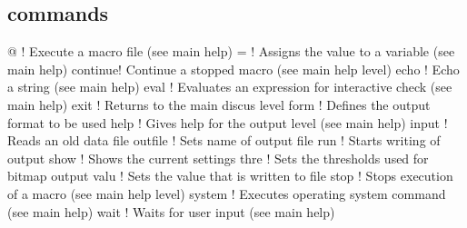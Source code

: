 \subsection*{commands}
\par
\begin{MacVerbatim}
@       ! Execute a macro file (see main help)
=       ! Assigns the value to a variable (see main help)
continue! Continue a stopped macro (see main help level)
echo    ! Echo a string (see main help)
eval    ! Evaluates an expression for interactive check (see main help)
exit    ! Returns to the main discus level
form    ! Defines the output format to be used
help    ! Gives help for the output level (see main help)
input   ! Reads an old data file
outfile ! Sets name of output file
run     ! Starts writing of output
show    ! Shows the current settings
thre    ! Sets the thresholds used for bitmap output
valu    ! Sets the value that is written to file
stop    ! Stops execution of a macro (see main help level)
system  ! Executes operating system command (see main help)
wait    ! Waits for user input (see main help)
\end{MacVerbatim}
